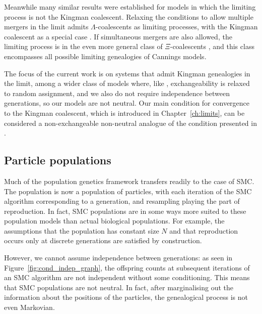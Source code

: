 Meanwhile many similar results were established for models in which the limiting process is not the Kingman coalescent.
Relaxing the conditions to allow multiple mergers in the limit admits $\Lambda$-coalescents as limiting processes, with the Kingman coalescent as a special case \parencite{pitman1999, sagitov1999, mohlesagitov1998}.
If simultaneous mergers are also allowed, the limiting process is in the even more general class of $\Xi$-coalescents \parencite{mohle2001}, and this class encompasses all possible limiting genealogies of Cannings models.

The focus of the current work is on systems that admit Kingman genealogies in the limit, among a wider class of models where, like \textcite{mohle1998, mohle1999}, exchangeability is relaxed to random assignment, and we also do not require independence between generations, so our models are not neutral. 
Our main condition for convergence to the Kingman coalescent, which is introduced in Chapter~\ref{ch:limits}, can be considered a non-exchangeable non-neutral analogue of the condition presented in \textcite{mohle2000}.




\subsection{Particle populations}
Much of the population genetics framework transfers readily to the case of SMC. The population is now a population of particles, with each iteration of the SMC algorithm corresponding to a generation, and resampling playing the part of reproduction.
In fact, SMC populations are in some ways more suited to these population models than actual biological populations.
For example, the assumptions that the population has constant size $N$ and that reproduction occurs only at discrete generations are satisfied by construction.

However, we cannot assume independence between generations: as seen in Figure~\ref{fig:cond_indep_graph}, the offspring counts at subsequent iterations of an SMC algorithm are not independent without some conditioning. 
This means that SMC populations are not neutral.
In fact, after marginalising out the information about the positions of the particles, the genealogical process is not even Markovian.






